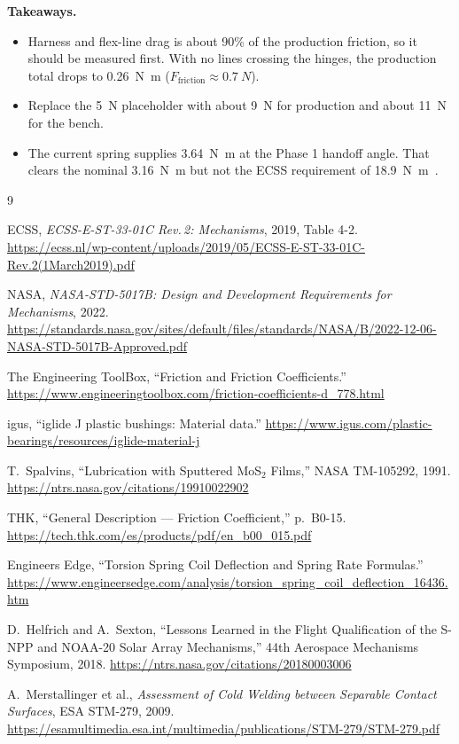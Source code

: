 \documentclass[11pt]{article}
\begin{document}
\textbf{Takeaways.}
\begin{itemize}
    \item Harness and flex-line drag is about 90\% of the production friction, so it should be measured
    first. With no lines crossing the hinges, the production total drops to \SI{0.26}{N.m}
    ($F_{\text{friction}} \approx \SI{0.7}{N}$).
    \item Replace the \SI{5}{N} placeholder with about \SI{9}{N} for production and about \SI{11}{N} for
    the bench.
    \item The current spring supplies \SI{3.64}{N.m} at the Phase 1 handoff angle. That clears the nominal
    \SI{3.16}{N.m} but not the ECSS requirement of \SI{18.9}{N.m}~\cite{ecss,nasa5017}.
\end{itemize}

{\small
\begin{thebibliography}{9}
\setlength{\itemsep}{0pt}

 ECSS, \emph{ECSS-E-ST-33-01C Rev.\,2: Mechanisms}, 2019, Table 4-2.
\url{https://ecss.nl/wp-content/uploads/2019/05/ECSS-E-ST-33-01C-Rev.2(1March2019).pdf}

 NASA, \emph{NASA-STD-5017B: Design and Development Requirements for Mechanisms}, 2022.
\url{https://standards.nasa.gov/sites/default/files/standards/NASA/B/2022-12-06-NASA-STD-5017B-Approved.pdf}

 The Engineering ToolBox, ``Friction and Friction Coefficients.''
\url{https://www.engineeringtoolbox.com/friction-coefficients-d_778.html}

 igus, ``iglide J plastic bushings: Material data.''
\url{https://www.igus.com/plastic-bearings/resources/iglide-material-j}

 T.~Spalvins, ``Lubrication with Sputtered MoS$_2$ Films,'' NASA TM-105292, 1991.
\url{https://ntrs.nasa.gov/citations/19910022902}

 THK, ``General Description --- Friction Coefficient,'' p.~B0-15.
\url{https://tech.thk.com/es/products/pdf/en_b00_015.pdf}

 Engineers Edge, ``Torsion Spring Coil Deflection and Spring Rate Formulas.''
\url{https://www.engineersedge.com/analysis/torsion_spring_coil_deflection_16436.htm}

 D.~Helfrich and A.~Sexton, ``Lessons Learned in the Flight Qualification of the S-NPP and
NOAA-20 Solar Array Mechanisms,'' 44th Aerospace Mechanisms Symposium, 2018.
\url{https://ntrs.nasa.gov/citations/20180003006}

 A.~Merstallinger et al., \emph{Assessment of Cold Welding between Separable Contact
Surfaces}, ESA STM-279, 2009.
\url{https://esamultimedia.esa.int/multimedia/publications/STM-279/STM-279.pdf}

\end{thebibliography}
}
\end{document}

